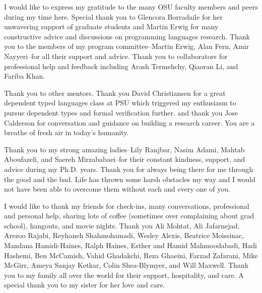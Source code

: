 I would like to express my gratitude to the many OSU faculty members and peers during my time here. 
Special thank you to Glencora Borradaile for her unwavering support 
of graduate students and Martin Erwig for many constructive advice and discussions on 
programming languages research. 
Thank you to the members of my program committee--Martin Erwig, 
Alan Fern, Amir Nayyeri--for all their support and advice. 
%
Thank you to collaborators for professional help and feedback including
Arash Termehchy, Qiaoran Li, and Fariba Khan. 

%
Thank you to other mentors. 
Thank you David Christiansen for a great dependent typed languages class at PSU
which triggered my enthusiasm to pursue dependent types and formal verification further.
and thank you Jose Calderson for conversation and guidance on building a research career. You
are a breathe of fresh air in today's humanity.
%


Thank you to my strong amazing ladies--Lily Ranjbar, 
Nasim Adami, Mahtab Aboufazeli, and Saereh Mirzababaei--for their constant kindness, 
support, and advice during my Ph.D. years. Thank you for always being there for me 
through the good and the bad. Life has thrown some harsh obstacles my way and I 
would not have been able to overcome them without each and every one of you. 
%

%
I would like to thank my friends for 
check-ins, many conversations, professional and personal help, sharing lots of coffee (sometimes over complaining about grad school), hangouts, and movie nights.
Thank you Ali Mohtat, Ali Jafarnejad, 
Arezoo Rajabi, Reyhaneh Shahmohamadi, Wesley Alexis,
Beatrice Moissinac, Mandana Hamidi-Haines, Ralph Haines, 
Esther and Hamid Mahmoodabadi, Hadi Hashemi, Ben McCamish, Vahid Ghadakchi, Reza Ghaeini, Farzad Zafarani, Mike McGirr, Ameya Sanjay Ketkar, Colin Shea-Blymyer, and Will Maxwell.
%
Thank you to my family all over the world for their support, hospitality, and care.
A special thank you to my sister for her love and care. 

